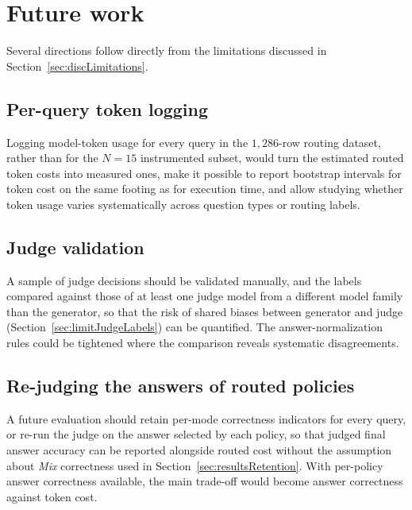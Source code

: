 \documentclass[english, bibtex]{kththesis}               %
\numberwithin{listing}{chapter}
\begin{document}
\section{Future work}
\label{sec:futureWork}

Several directions follow directly from the limitations discussed in Section~\ref{sec:discLimitations}.

\subsection{Per-query token logging} Logging model-token usage for every query in the $1{,}286$-row routing dataset, rather than for the $N = 15$ instrumented subset, would turn the estimated routed token costs into measured ones, make it possible to report bootstrap intervals for token cost on the same footing as for execution time, and allow studying whether token usage varies systematically across question types or routing labels.

\subsection{Judge validation} A sample of judge decisions should be validated manually, and the labels compared against those of at least one judge model from a different model family than the generator, so that the risk of shared biases between generator and judge (Section~\ref{sec:limitJudgeLabels}) can be quantified. The answer-normalization rules could be tightened where the comparison reveals systematic disagreements.

\subsection{Re-judging the answers of routed policies} A future evaluation should retain per-mode correctness indicators for every query, or re-run the judge on the answer selected by each policy, so that judged final answer accuracy can be reported alongside routed cost without the assumption about \emph{Mix} correctness used in Section~\ref{sec:resultsRetention}. With per-policy answer correctness available, the main trade-off would become answer correctness against token cost.
\end{document}
